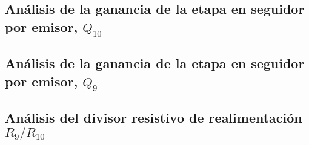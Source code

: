 

\subsection{Análisis de la ganancia de la etapa en seguidor por emisor, $Q_{10}$}

\subsection{Análisis de la ganancia de la etapa en seguidor por emisor, $Q_{9}$}

\subsection{Análisis del divisor resistivo de realimentación $R_{9}/R_{10}$}
